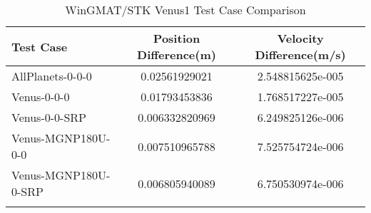 \begin{table}[htbp!]
\centering
\caption{ WinGMAT/STK Venus1 Test Case Comparison}
      \begin{tabular}{lcc}
      \hline\hline
          Test Case & Position Difference(m) & Velocity Difference(m/s) \\
         \hline
         AllPlanets-0-0-0 & 0.02561929021 & 2.548815625e-005 \\
         Venus-0-0-0 & 0.01793453836 & 1.768517227e-005 \\
         Venus-0-0-SRP & 0.006332820969 & 6.249825126e-006 \\
         Venus-MGNP180U-0-0 & 0.007510965788 & 7.525754724e-006 \\
         Venus-MGNP180U-0-SRP & 0.006805940089 & 6.750530974e-006 \\
      \hline\hline
      \label{Table: Venus1 WinGMAT-STK Table} 
\end{tabular}
\end{table}
